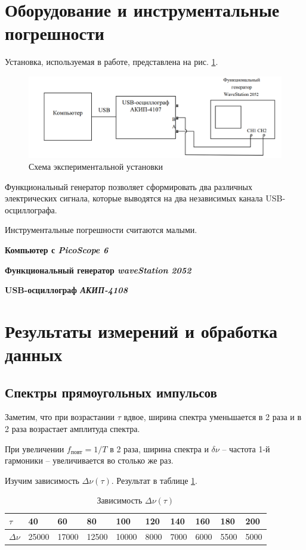\documentclass[a4paper]{article}
\newcommand{\equip}[1]{{\bf #1}

}
\begin{document}
\section{Оборудование и инструментальные погрешности}

Установка, используемая в работе, представлена на рис. \ref{fig:scheme}.
\begin{figure}
	\centering
	\includegraphics[width=1\linewidth]{scheme}
	\caption{Схема экспериментальной установки}
	\label{fig:scheme}
\end{figure}
Функциональный генератор позволяет сформировать два различных электрических сигнала, которые выводятся на два независимых канала USB-осциллографа.

Инструментальные погрешности считаются малыми.

\equip{Компьютер  с \emph{PicoScope 6}}
\equip{Функциональный генератор \emph{waveStation 2052}}
\equip{USB-осциллограф \emph{АКИП-4108}}

\section{Результаты измерений и обработка данных}

\subsection{Спектры прямоугольных импульсов}

Заметим, что при возрастании $ \tau $ вдвое, ширина спектра уменьшается в 2 раза и в 2 раза возрастает амплитуда спектра.

При увеличении $ f_{повт} = 1/T $ в 2 раза, ширина спектра и $ \delta \nu $ -- частота 1-й гармоники --  увеличивается во столько же раз. 

Изучим зависимость $ \Delta \nu (\tau) $. Результат в таблице \ref{tab:nu-tau}.

\begin{table}[h]
	\centering
	\begin{tabular}{|l|l|l|l|l|l|l|l|l|l|}
		\hline
		${\tau}$      & 40    & 60    & 80    & 100   & 120  & 140  & 160  & 180  & 200  \\ \hline
		${\Delta \nu}$ & 25000 & 17000 & 12500 & 10000 & 8000 & 7000 & 6000 & 5500 & 5000 \\ \hline
	\end{tabular}
	\caption{Зависимость $\Delta \nu (\tau)$}
	\label{tab:nu-tau}
\end{table}
\end{document}

